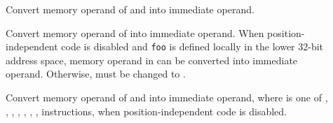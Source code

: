 \begin{description}
\item[]
  Convert memory operand of  and  into
  immediate operand.

\begin{table}[H]
\Hrule
\caption{Call and Jmp Conversion}
\begin{center}
\small{}
\end{center}
\Hrule
\end{table}

\item[]
  Convert memory operand of  into immediate operand.  When
  position-independent code is disabled and \texttt{foo} is defined
  locally in the lower 32-bit address space, memory operand in 
  can be converted into immediate operand.  Otherwise,  must
  be changed to .

\begin{table}[H]
\Hrule
\caption{Mov Conversion}
\begin{center}
\small{}
\end{center}
\Hrule
\end{table}

\item[]
  Convert memory operand of  and  into immediate
  operand, where  is one of , ,
  , , , , , 
  instructions, when position-independent code is disabled.


\end{description}
